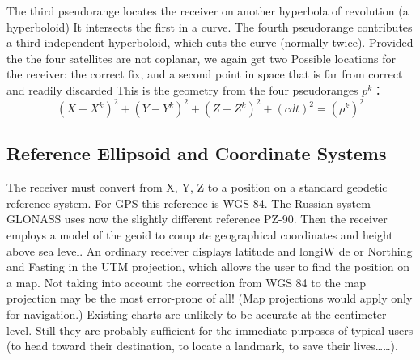 	The third pseudorange locates the receiver on another hyperbola of revolution (a hyperboloid) It intersects the first in a curve. The fourth pseudorange contributes a third independent hyperboloid, which cuts the curve (normally twice). Provided the the four satellites are not coplanar, we again get two Possible locations for the receiver: the correct fix, and a second point in space that is far from correct and readily discarded This is the geometry from the four pseudoranges $p^{k}$：
	\[ (X-X^{k})^{2}+(Y-Y^{k})^{2}+(Z-Z^{k})^{2}+(c dt)^{2}=(\rho ^{k})^{2} \]
	
	\subsection{Reference Ellipsoid and Coordinate Systems}
	The receiver must convert from X, Y, Z to a position on a standard geodetic reference system. For GPS this reference is WGS 84. The Russian system GLONASS uses now the slightly different reference PZ-90. Then the receiver employs a model of the geoid to compute geographical coordinates and height above sea level.  An ordinary receiver displays latitude and longiW de or Northing and Fasting in the UTM projection, which allows the user to find the position on a map. Not taking into account the correction from WGS 84 to the map projection may be the most error-prone of all! (Map projections would apply only for navigation.) Existing charts are unlikely to be accurate at the centimeter level. Still they are probably sufficient for the immediate purposes of typical users (to head toward their destination, to locate a landmark, to save their lives……).
	
